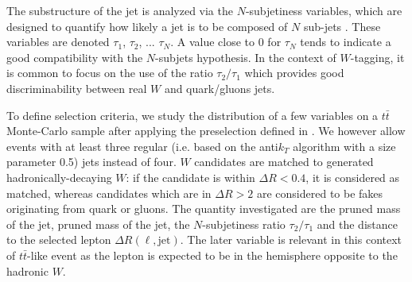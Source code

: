 
            The substructure of the jet is analyzed via the $N$-subjetiness variables,
            which are designed to quantify how likely a jet is to be composed of $N$
            sub-jets \cite{N-subjettiness}. These variables are denoted $\tau_1$,
            $\tau_2$, ... $\tau_N$. A value close to 0 for $\tau_N$ tends to indicate
            a good compatibility with the $N$-subjets hypothesis. In the context of
            $W$-tagging, it is common to focus on the use of the ratio $\tau_2/\tau_1$
            which provides good discriminability between real $W$ and quark/gluons jets.

            To define selection criteria, we study the distribution of a few variables
            on a $t\bar{t}$ Monte-Carlo sample after applying the preselection defined in
            . We however allow events with at
            least three regular (i.e. based on the anti$k_T$ algorithm with a size parameter 0.5) jets
            instead of four. $W$ candidates are matched to generated
            hadronically-decaying $W$: if the candidate is within $\Delta R < 0.4$, it
            is considered as matched, whereas candidates which are in $\Delta R > 2$ are
            considered to be fakes originating from quark or gluons.
            The quantity investigated are the pruned mass of the jet,
            pruned mass of the jet, the $N$-subjetiness ratio $\tau_2 / \tau_1$ and the
            distance to the selected lepton $\Delta R (\ell,\text{jet})$. The later
            variable is relevant in this context of $t\bar{t}$-like event as the lepton
            is expected to be in the hemisphere opposite to the hadronic $W$.

